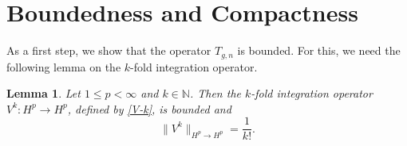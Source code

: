 \documentclass[preprint,12pt]{elsarticle}
\numberwithin{equation}{section}
\newtheorem{lemma}{Lemma}[section]
\theoremstyle{remark}
\begin{document}
\section{Boundedness and Compactness}

As a first step, we show that the operator $T_{g,n}$ is bounded. For this, we need the following lemma on the
$k$-fold integration operator.


\begin{lemma}\label{lem:Vk-sharp}
Let $1\le p<\infty$ and $k\in\mathbb{N}$. Then the $k$-fold integration operator
$V^k:H^p\to H^p$, defined by \eqref{V-k}, is bounded and
\begin{equation*}
\|V^k\|_{H^p\to H^p}=\frac{1}{k!}.
\end{equation*}
\end{lemma}
\end{document}
